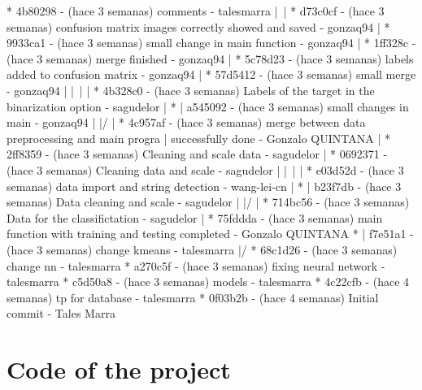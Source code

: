 \documentclass[11pt,a4paper]{article}
\begin{document}
\begin{verbatimprog}
*   4b80298 - (hace 3 semanas) comments - talesmarra
|\  
| * d73c0cf - (hace 3 semanas) confusion matrix images correctly showed and saved - gonzaq94
| * 9933ca1 - (hace 3 semanas) small change in main function - gonzaq94
| * 1ff328c - (hace 3 semanas) merge finished - gonzaq94
| * 5c78d23 - (hace 3 semanas) labels added to confusion matrix - gonzaq94
| *   57d5412 - (hace 3 semanas) small merge - gonzaq94
| |\  
| | * 4b328c0 - (hace 3 semanas) Labels of the target in the binarization option - sagudelor
| * | a545092 - (hace 3 semanas) small changes in main - gonzaq94
| |/  
| * 4c957af - (hace 3 semanas) merge between data preprocessing and main progra 
|            successfully done - Gonzalo QUINTANA
| * 2ff8359 - (hace 3 semanas) Cleaning and scale data - sagudelor
| *   0692371 - (hace 3 semanas) Cleaning data and scale - sagudelor
| |\  
| | * e03d52d - (hace 3 semanas) data import and string detection - wang-lei-cn
| * | b23f7db - (hace 3 semanas) Data cleaning and scale - sagudelor
| |/  
| * 714bc56 - (hace 3 semanas) Data for the classifictation - sagudelor
| * 75fddda - (hace 3 semanas) main function with training and testing completed - Gonzalo QUINTANA
* | f7e51a1 - (hace 3 semanas) change kmeans - talesmarra
|/  
* 68c1d26 - (hace 3 semanas) change nn - talesmarra
* a270c5f - (hace 3 semanas) fixing neural network - talesmarra
* c5d50a8 - (hace 3 semanas) models - talesmarra
* 4c22cfb - (hace 4 semanas) tp for database - talesmarra
* 0f03b2b - (hace 4 semanas) Initial commit - Tales Marra

\end{verbatimprog}

\section{Code of the project}
\end{document}
